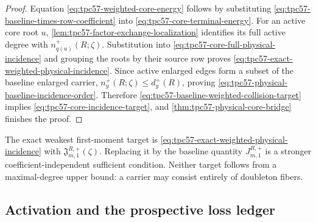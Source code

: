 \begin{proof}
Equation \eqref{eq:tpc57-weighted-core-energy} follows by substituting
\eqref{eq:tpc57-baseline-times-row-coefficient} into
\eqref{eq:tpc57-core-terminal-energy}.  For an active core root \(u\),
\cref{lem:tpc57-factor-exchange-localization} identifies its full active
degree with \(n_{q(u)}^+(R;\zeta)\).  Substitution into
\eqref{eq:tpc57-core-full-physical-incidence} and grouping the roots by
their source row proves \eqref{eq:tpc57-exact-weighted-physical-incidence}.
Since active enlarged edges form a subset of the baseline enlarged carrier,
\(n_y^+(R;\zeta)\le d_y^+(R)\), proving
\eqref{eq:tpc57-physical-baseline-incidence-order}.  Therefore
\eqref{eq:tpc57-baseline-weighted-collision-target} implies
\eqref{eq:tpc57-core-incidence-target}, and
\cref{thm:tpc57-physical-core-bridge} finishes the proof.
\end{proof}

The exact weakest first-moment target is
\eqref{eq:tpc57-exact-weighted-physical-incidence} with
\(\mathfrak J_{m,1}^{R,+}(\zeta)\).  Replacing it by the baseline quantity
\(J_{m,1}^{R,+}\) is a stronger coefficient-independent sufficient
condition.  Neither target follows from a maximal-degree upper bound: a
carrier may consist entirely of doubleton fibers.

\subsection{Activation and the prospective loss ledger}

